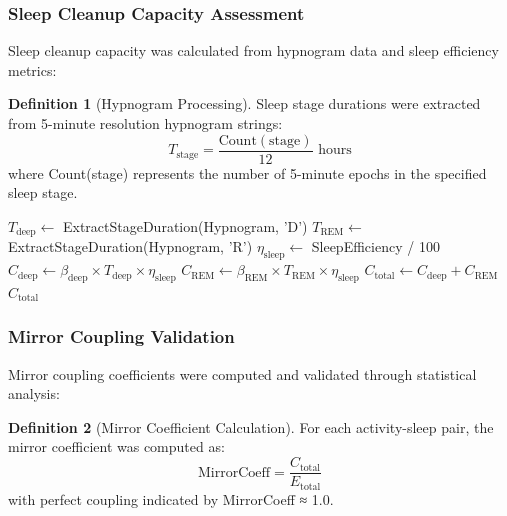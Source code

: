\documentclass[12pt,a4paper]{article}
\theoremstyle{definition}
\newtheorem{definition}{Definition}[section]
\begin{document}
\subsubsection{Sleep Cleanup Capacity Assessment}

Sleep cleanup capacity was calculated from hypnogram data and sleep efficiency metrics:

\begin{definition}[Hypnogram Processing]
Sleep stage durations were extracted from 5-minute resolution hypnogram strings:
\begin{equation}
T_{\text{stage}} = \frac{\text{Count}(\text{stage})}{12} \text{ hours}
\end{equation}
where Count(stage) represents the number of 5-minute epochs in the specified sleep stage.
\end{definition}

\begin{algorithm}
\caption{Cleanup Capacity Calculation}
\begin{algorithmic}
    \State $T_{\text{deep}} \leftarrow$ ExtractStageDuration(Hypnogram, 'D')
    \State $T_{\text{REM}} \leftarrow$ ExtractStageDuration(Hypnogram, 'R')
    \State $\eta_{\text{sleep}} \leftarrow$ SleepEfficiency / 100
    \State $C_{\text{deep}} \leftarrow \beta_{\text{deep}} \times T_{\text{deep}} \times \eta_{\text{sleep}}$
    \State $C_{\text{REM}} \leftarrow \beta_{\text{REM}} \times T_{\text{REM}} \times \eta_{\text{sleep}}$
    \State $C_{\text{total}} \leftarrow C_{\text{deep}} + C_{\text{REM}}$
    \State \Return $C_{\text{total}}$
\EndProcedure
\end{algorithmic}
\end{algorithm}

\subsubsection{Mirror Coupling Validation}

Mirror coupling coefficients were computed and validated through statistical analysis:

\begin{definition}[Mirror Coefficient Calculation]
For each activity-sleep pair, the mirror coefficient was computed as:
\begin{equation}
\text{MirrorCoeff} = \frac{C_{\text{total}}}{E_{\text{total}}}
\end{equation}
with perfect coupling indicated by MirrorCoeff ≈ 1.0.
\end{definition}
\end{document}
